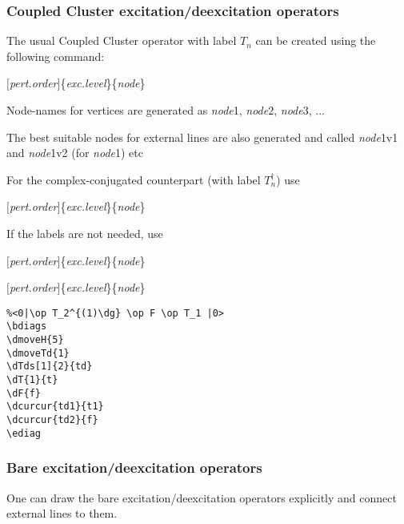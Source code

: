 \documentclass[a4paper]{article}
\newcommand{\myind}{\hspace{10pt}}
\begin{document}
\subsubsection{Coupled Cluster excitation/deexcitation operators}

The usual Coupled Cluster operator with label $T_{n}$ can be created using the following command:

\myind{\bf \textbackslash dT}$[${\it pert.order}$]$\{{\it exc.level}\}\{{\it node}\}

Node-names for vertices are generated as {\it node}1, {\it node}2, {\it node}3, ...

The best suitable nodes for external lines are also generated and called {\it node}1v1 and {\it node}1v2 
(for {\it node}1) etc

For the complex-conjugated counterpart (with label $T^{\dagger}_{n}$) use 

\myind{\bf \textbackslash dTd}$[${\it pert.order}$]$\{{\it exc.level}\}\{{\it node}\}

If the labels are not needed, use

\myind{\bf \textbackslash dTs}$[${\it pert.order}$]$\{{\it exc.level}\}\{{\it node}\}

\myind{\bf \textbackslash dTds}$[${\it pert.order}$]$\{{\it exc.level}\}\{{\it node}\}

 \begin{minipage}[b]{0.5\linewidth}\centering
  \begin{lstlisting}
%<0|\op T_2^{(1)\dg} \op F \op T_1 |0>
\bdiags
\dmoveH{5}
\dmoveTd{1}
\dTds[1]{2}{td}
\dT{1}{t}
\dF{f}
\dcurcur{td1}{t1}
\dcurcur{td2}{f}
\ediag
  \end{lstlisting}
 \end{minipage}
 \begin{minipage}[b]{0.5\linewidth}\centering
\bdiags
{}
\ediag
 \end{minipage}

\subsubsection{Bare excitation/deexcitation operators}

One can draw the bare excitation/deexcitation operators explicitly and connect external lines to them.
\end{document}
